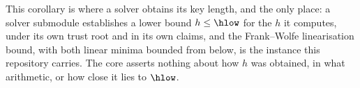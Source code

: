
This corollary is where a solver obtains its key length, and the only
place: a solver submodule establishes a lower bound $h\le\hlow$ for the $h$
it computes, under its own trust root and in its own claims, and the
Frank--Wolfe linearisation bound, with both linear minima bounded from
below, is the instance this repository carries. The core asserts nothing about how
$h$ was obtained, in what arithmetic, or how close it lies to $\hlow$.


